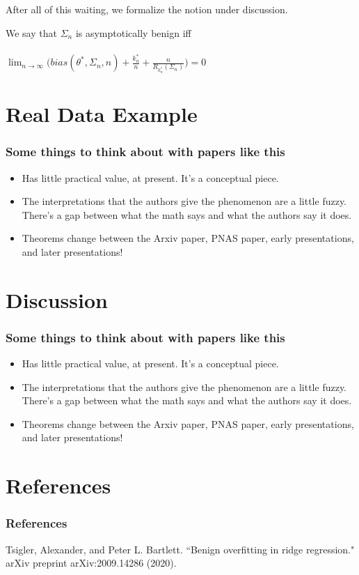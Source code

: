 \documentclass[pdf]{beamer}
\begin{document}
\begin{frame}
After all of this waiting, we formalize the notion under discussion.

\begin{definition}
We say that $\Sigma_{n}$ is asymptotically benign iff \\~\\

$\displaystyle \lim_{n\to\infty} \big ( bias(\theta^{*}, \Sigma_{n}, n)  + \frac{k^{*}_{n}}{n} +  \frac{n}{R_{k^{*}_{n}}(\Sigma_{n})} \big ) = 0$

\end{definition}
\end{frame}


\section{Real Data Example}

\begin{frame}
\frametitle{Some things to think about with papers like this}
\begin{itemize}
\item Has little practical value, at present.  It's a conceptual piece.
\item The interpretations that the authors give the phenomenon are a little fuzzy.  There's a gap between what the math says and what the authors say it does.
\item Theorems change between the Arxiv paper, PNAS paper, early presentations, and later presentations!
\end{itemize}
\end{frame}

\section{Discussion}

\begin{frame}
\frametitle{Some things to think about with papers like this}
\begin{itemize}
\item Has little practical value, at present.  It's a conceptual piece.
\item The interpretations that the authors give the phenomenon are a little fuzzy.  There's a gap between what the math says and what the authors say it does.
\item Theorems change between the Arxiv paper, PNAS paper, early presentations, and later presentations!
\end{itemize}
\end{frame}


\section*{References}

\begin{frame}[t, allowframebreaks]
\frametitle{References}
Tsigler, Alexander, and Peter L. Bartlett. ``Benign overfitting in ridge regression." arXiv preprint arXiv:2009.14286 (2020).
\end{frame}
\end{document}
